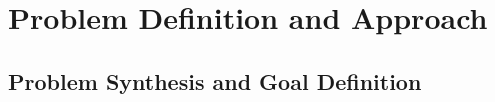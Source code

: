 \chapter{Problem Definition and Approach}
\label{chapter:problem-definition}

\section{Problem Synthesis and Goal Definition}
\label{sec:problem-synthesis}



